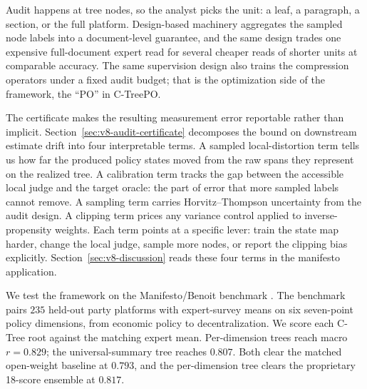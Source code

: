 Audit happens at tree nodes, so the analyst picks the unit: a
leaf, a paragraph, a section, or the full platform. Design-based
machinery aggregates the sampled node labels into a document-level
guarantee, and the same design trades one expensive full-document
expert read for several cheaper reads of shorter units at
comparable accuracy. The same supervision design also trains the
compression operators under a fixed audit budget; that is the
optimization side of the framework, the ``PO'' in C-TreePO.

The certificate makes the resulting measurement error reportable
rather than implicit. Section~\ref{sec:v8-audit-certificate}
decomposes the bound on downstream estimate drift into four
interpretable terms. A sampled local-distortion term tells us how
far the produced policy states moved from the raw spans they
represent on the realized tree. A calibration term tracks the gap
between the accessible local judge and the target oracle: the part
of error that more sampled labels cannot remove. A sampling term
carries Horvitz--Thompson uncertainty from the audit design. A
clipping term prices any variance control applied to
inverse-propensity weights. Each term points at a specific lever:
train the state map harder, change the local judge, sample more
nodes, or report the clipping bias explicitly.
Section~\ref{sec:v8-discussion} reads these four terms in the
manifesto application.

We test the framework on the Manifesto/Benoit benchmark
\citep{BenoitEtAl2025}. The benchmark pairs \(235\) held-out party
platforms with expert-survey means on six seven-point policy
dimensions, from economic policy to decentralization. We score each
C-Tree root against the matching expert mean. Per-dimension trees
reach macro \(r=0.829\); the universal-summary tree reaches
\(0.807\). Both clear the matched open-weight baseline at
\(0.793\), and the per-dimension tree clears the proprietary
18-score ensemble at \(0.817\).

